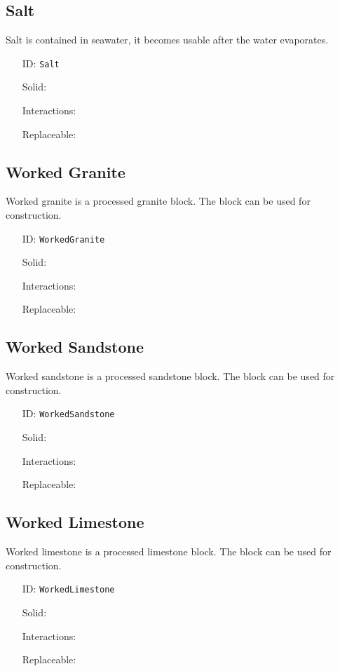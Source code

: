 \subsection{Salt}\label{subsec:blocks_salt}
Salt is contained in seawater, it becomes usable after the water evaporates.
\newline
\begin{itemize}[nosep]
\item[ID:] \texttt{Salt}
\item[Solid:]  \Checkmark \item[Interactions:]  \Checkmark \item[Replaceable:]  \XSolidBrush \end{itemize}

\subsection{Worked Granite}\label{subsec:blocks_worked granite}
Worked granite is a processed granite block.
                The block can be used for construction.
\newline
\begin{itemize}[nosep]
\item[ID:] \texttt{WorkedGranite}
\item[Solid:]  \Checkmark \item[Interactions:]  \XSolidBrush \item[Replaceable:]  \XSolidBrush \end{itemize}

\subsection{Worked Sandstone}\label{subsec:blocks_worked sandstone}
Worked sandstone is a processed sandstone block.
                The block can be used for construction.
\newline
\begin{itemize}[nosep]
\item[ID:] \texttt{WorkedSandstone}
\item[Solid:]  \Checkmark \item[Interactions:]  \XSolidBrush \item[Replaceable:]  \XSolidBrush \end{itemize}

\subsection{Worked Limestone}\label{subsec:blocks_worked limestone}
Worked limestone is a processed limestone block.
                The block can be used for construction.
\newline
\begin{itemize}[nosep]
\item[ID:] \texttt{WorkedLimestone}
\item[Solid:]  \Checkmark \item[Interactions:]  \XSolidBrush \item[Replaceable:]  \XSolidBrush \end{itemize}

